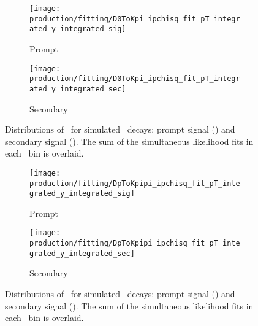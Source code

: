 \begin{figure}
  \begin{subfigure}[b]{0.5\textwidth}
    \centering
    \texttt{[image: production/fitting/D0ToKpi\_ipchisq\_fit\_pT\_integrated\_y\_integrated\_sig]}
    \caption{Prompt}
    \label{fig:prod:fitting:prefits:D0ToKpi:prompt}
  \end{subfigure}
  \begin{subfigure}[b]{0.5\textwidth}
    \centering
    \texttt{[image: production/fitting/D0ToKpi\_ipchisq\_fit\_pT\_integrated\_y\_integrated\_sec]}
    \caption{Secondary}
    \label{fig:prod:fitting:prefits:D0ToKpi:secondary}
  \end{subfigure}
  \caption{%
    Distributions of \lnipchisq\ for simulated \DzToKpi\ decays: prompt signal 
    \PDzero () and secondary 
    signal \PDzero ().
    The sum of the simultaneous likelihood fits in each \pTy\ bin is overlaid.
  }
  \label{fig:prod:fitting:prefits:D0ToKpi}
\end{figure}

\begin{figure}
  \begin{subfigure}[b]{0.5\textwidth}
    \centering
    \texttt{[image: production/fitting/DpToKpipi\_ipchisq\_fit\_pT\_integrated\_y\_integrated\_sig]}
    \caption{Prompt}
    \label{fig:prod:fitting:prefits:DpToKpipi:prompt}
  \end{subfigure}
  \begin{subfigure}[b]{0.5\textwidth}
    \centering
    \texttt{[image: production/fitting/DpToKpipi\_ipchisq\_fit\_pT\_integrated\_y\_integrated\_sec]}
    \caption{Secondary}
    \label{fig:prod:fitting:prefits:DpToKpipi:secondary}
  \end{subfigure}
  \caption{%
    Distributions of \lnipchisq\ for simulated \DpToKpipi\ decays: prompt 
    signal \PDplus () and 
    secondary signal \PDplus 
    ().
    The sum of the simultaneous likelihood fits in each \pTy\ bin is overlaid.
  }
  \label{fig:prod:fitting:prefits:DpToKpipi}
\end{figure}

